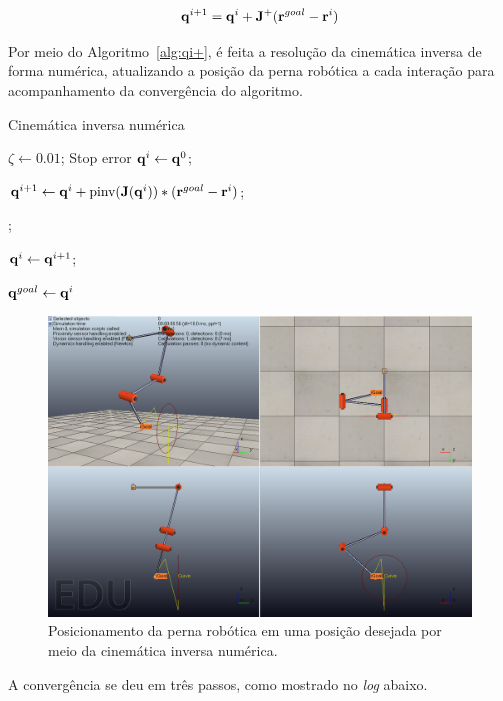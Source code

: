 \begin{equation}\label{eq:qi+}
	\mathbf{q}^{i+1} = \mathbf{q}^i + \mathbf{J}^+ (\mathbf{r}^{goal} - \mathbf{r}^i)
\end{equation}

Por meio do Algoritmo~\ref{alg:qi+}, é feita a resolução da cinemática inversa de forma numérica, atualizando a posição da perna robótica a cada interação para acompanhamento da convergência do algoritmo.

\begin{algorithm}
	\caption{Cinemática inversa numérica}\label{alg:qi+}
	\begin{algorithmic}[1]
		\State $\zeta \gets 0.01$; \Comment Stop error
		\State $\mathbf{q}^i \gets \mathbf{q}^0$;
		
			
	 		\State $\mathbf{q}^{i+1} \gets \mathbf{q}^i + \text{pinv}(\mathbf{J}(\mathbf{q}^i))*(\mathbf{r}^{goal} - \mathbf{r}^i)$;
			
			;
			
			\State $\mathbf{q}^i \gets \mathbf{q}^{i+1}$;
			
		\EndWhile
		
		\State $\mathbf{q}^{goal} \gets \mathbf{q}^i$ 
		
	\end{algorithmic}
\end{algorithm}

\begin{figure}[H]
	\centering
	\includegraphics[width=0.75\linewidth]{img/ex4}
	\caption{Posicionamento da perna robótica em uma posição desejada por meio da cinemática inversa numérica.}
	\label{fig:ex4}
\end{figure}

A convergência se deu em três passos, como mostrado no \textit{log} abaixo.

